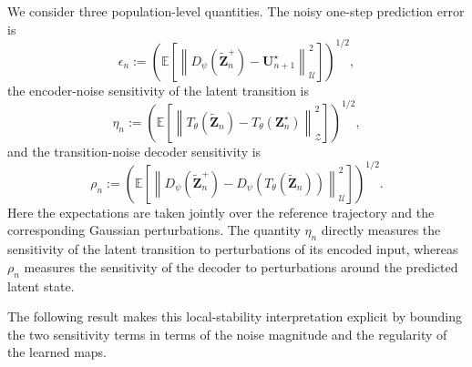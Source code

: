 \documentclass[11pt]{article}
\begin{document}
We consider three population-level quantities. The noisy one-step prediction error is
\begin{equation}
    \epsilon_n
    :=
    \left(
        \mathbb E
        \left[
            \left\|
                D_\psi(\widetilde{\mathbf Z}_n^+)
                -
                \mathbf U_{n+1}^\star
            \right\|_{\mathcal U}^2
        \right]
    \right)^{1/2},
    \label{eq:noisy_prediction_error}
\end{equation}
the encoder-noise sensitivity of the latent transition is
\begin{equation}
    \eta_n
    :=
    \left(
        \mathbb E
        \left[
            \left\|
                T_\theta(\widetilde{\mathbf Z}_n)
                -
                T_\theta(\mathbf Z_n^\star)
            \right\|_{\mathcal Z}^2
        \right]
    \right)^{1/2},
    \label{eq:encoder_noise_sensitivity}
\end{equation}
and the transition-noise decoder sensitivity is
\begin{equation}
    \rho_n
    :=
    \left(
        \mathbb E
        \left[
            \left\|
                D_\psi(\widetilde{\mathbf Z}_n^+)
                -
                D_\psi(T_\theta(\widetilde{\mathbf Z}_n))
            \right\|_{\mathcal U}^2
        \right]
    \right)^{1/2}.
    \label{eq:transition_noise_robustness}
\end{equation}
Here the expectations are taken jointly over the reference trajectory and the corresponding Gaussian perturbations. The quantity $\eta_n$ directly measures the sensitivity of the latent transition to perturbations of its encoded input, whereas $\rho_n$ measures the sensitivity of the decoder to perturbations around the predicted latent state.

The following result makes this local-stability interpretation explicit by bounding the two sensitivity terms in terms of the noise magnitude and the regularity of the learned maps.
\end{document}
